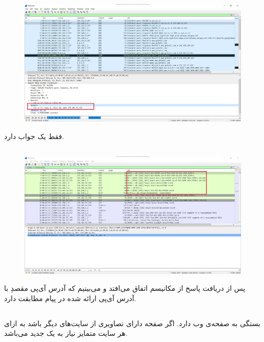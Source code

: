 \documentclass{article}
\begin{document}
\subsection{}
\begin{figure}[H]
    \centering
    \includegraphics[width=1.0\textwidth]{figures/55.jpg}
    \caption{}
    \label{fig:fig1}
\end{figure}
فقط یک جواب دارد.
\subsection{}
\begin{figure}[H]
    \centering
    \includegraphics[width=1.0\textwidth]{figures/56.jpg}
    \caption{}
    \label{fig:fig1}
\end{figure}
پس از دریافت پاسخ از  مکانیسم  اتفاق می‌افتد و می‌بینیم که آدرس آی‌پی مقصدِ  با آدرس آی‌پی ارائه شده در پیام  مطابقت دارد.
\subsection{}
بستگی به صفحه‌ی وب دارد. اگر صفحه دارای تصاویری از سایت‌های دیگر باشد به ازای هر سایت متمایز نیاز به یک  جدید می‌باشد.
\end{document}
